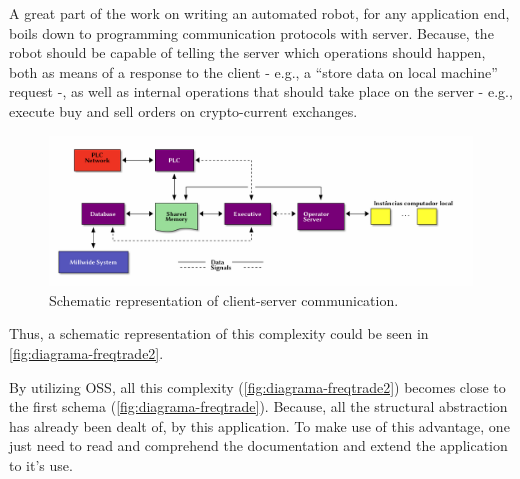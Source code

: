 \documentclass[
12pt,				%
openright,			%
oneside,			%
a4paper,			%
brazil,				%
english,			%
]{abntex2}
\begin{document}
A great part of the work on writing an automated robot, for any
application end, boils down to programming communication protocols
with server. Because, the robot should be capable of telling the
server which operations should happen, both as means of a response to
the client - e.g., a ``store data on local machine'' request -, as
well as internal operations that should take place on the server -
e.g., execute buy and sell orders on crypto-current exchanges.  

\begin{figure}[ht]
  \centering
    \caption{\label{fig:diagrama-freqtrade2} Schematic representation
      of client-server communication.}
  \includegraphics[width=1\linewidth]{ditaa_4.png}
\end{figure}

Thus, a schematic representation of this complexity could be seen in \autoref{fig:diagrama-freqtrade2}.

By utilizing OSS, all this complexity
(\autoref{fig:diagrama-freqtrade2}) becomes close to the first schema
(\autoref{fig:diagrama-freqtrade}). Because, all the structural
abstraction has already been dealt of, by this application. To make
use of this advantage, one just need to read and comprehend the
documentation and extend the application to it's use.
\end{document}
